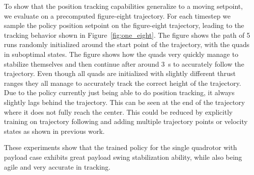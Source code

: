 To show that the position tracking capabilities generalize to a moving setpoint, we evaluate on a precomputed figure-eight trajectory. For each timestep we sample the policy position setpoint on the figure-eight trajectory, leading to the tracking behavior shown in Figure~\ref{fig:one_eight}. The figure shows the path of 5 runs randomly initialized around the start point of the trajectory, with the quads in suboptimal states. The figure shows how the quads very quickly manage to stabilize themselves and then continue after around 3~s to accurately follow the trajectory. Even though all quads are initialized with slightly different thrust ranges they all manage to accurately track the correct height of the trajectory. Due to the policy currently just being able to do position tracking, it always slightly lags behind the trajectory. This can be seen at the end of the trajectory where it does not fully reach the center. This could be reduced by explicitly training on trajectory following and adding multiple trajectory points or velocity states as shown in previous work.

These experiments show that the trained policy for the single quadrotor with payload case exhibits great payload swing stabilization ability, while also being agile and very accurate in tracking.

